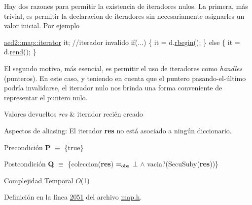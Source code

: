 Hay dos razones para permitir la existencia de iteradores nulos. La primera, más trivial, es permitir la declaracion de iteradores sin necesariamente asignarles un valor inicial. Por ejemplo 
\begin{DoxyCode}
\hyperlink{classaed2_1_1map_1_1iterator}{aed2::map::iterator} it;   \textcolor{comment}{//iterador invalido}
\textcolor{keywordflow}{if}(...) \{
  it = d.\hyperlink{classaed2_1_1map_ac412d3902112122c1bffe2d4283a4e9d_ac412d3902112122c1bffe2d4283a4e9d}{rbegin}();
\} \textcolor{keywordflow}{else} \{
  it = d.\hyperlink{classaed2_1_1map_a277f03b4f4b6b98879e4e4921081801f_a277f03b4f4b6b98879e4e4921081801f}{rend}();
\}
\end{DoxyCode}
 El segundo motivo, más esencial, es permitir el uso de iteradores como {\itshape handles} (punteros). En este caso, y teniendo en cuenta que el puntero pasando-\/el-\/último podría invalidarse, el iterador nulo nos brinda una forma conveniente de representar el puntero nulo.


\begin{DoxyRetVals}{Valores devueltos}
{\em res} & iterador recién creado\\
\hline
\end{DoxyRetVals}
\begin{DoxyParagraph}{Aspectos de aliasing\+:}
El iterador {\bfseries res} no está asociado a ningún diccionario.
\end{DoxyParagraph}
\begin{DoxyPrecond}{Precondición}
{\bfseries P} $\equiv$ \{true\} 
\end{DoxyPrecond}
\begin{DoxyPostcond}{Postcondición}
{\bfseries Q} $\equiv$ \{coleccion({\bfseries res}) $=_{\rm obs}$ $\bot$ $\land$ vacia?(Secu\+Suby({\bfseries res}))\}
\end{DoxyPostcond}

\begin{DoxyDescription}
\item[Complejidad Temporal]$O$(1)
\end{DoxyDescription}

Definición en la línea \hyperlink{map_8h_source_l02051}{2051} del archivo \hyperlink{map_8h_source}{map.\+h}.


